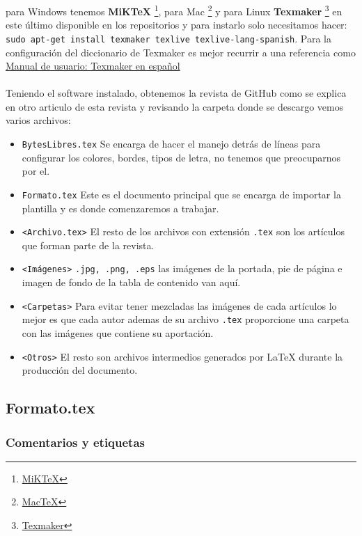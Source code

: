  para Windows tenemos \textbf{MiKTeX} \footnote{\href{http://miktex.org/}{MiKTeX}}, para Mac \footnote{\href{http://tug.org/mactex/}{MacTeX}} y para Linux \textbf{Texmaker} \footnote{\href{http://www.xm1math.net/texmaker/}{Texmaker}} en este último disponible en los repositorios y para instarlo solo necesitamos hacer: \texttt{sudo apt-get install texmaker texlive texlive-lang-spanish}. Para la configuración del diccionario de Texmaker es mejor recurrir a una referencia como \href{http://robustiana.com/118-texmakermanual}{Manual de usuario: Texmaker en español}

\paragraph{}Teniendo el software instalado, obtenemos la revista de GitHub como se explica en otro articulo de esta revista y revisando la carpeta donde se descargo vemos varios archivos:
\begin{itemize}
	\item \texttt{BytesLibres.tex} Se encarga de hacer el manejo detrás de líneas para configurar los colores, bordes, tipos de letra, no tenemos que preocuparnos por el.
	\item \texttt{Formato.tex} Este es el documento principal que se encarga de importar la plantilla y es donde comenzaremos a trabajar.
	\item \texttt{<Archivo.tex>} El resto de los archivos con extensión \texttt{.tex} son los artículos que forman parte de la revista.
	\item \texttt{<Imágenes>} \texttt{.jpg, .png, .eps} las imágenes de la portada, pie de página e imagen de fondo de la tabla de contenido van aquí.
	\item \texttt{<Carpetas>} Para evitar tener mezcladas las imágenes de cada artículos lo mejor es que cada autor ademas de su archivo \texttt{.tex} proporcione una carpeta con las imágenes que contiene su aportación.
	\item \texttt{<Otros>} El resto son archivos intermedios generados por \LaTeX{} durante la producción del documento.
\end{itemize}


\subsection*{Formato.tex}
\subsubsection*{Comentarios y etiquetas}
